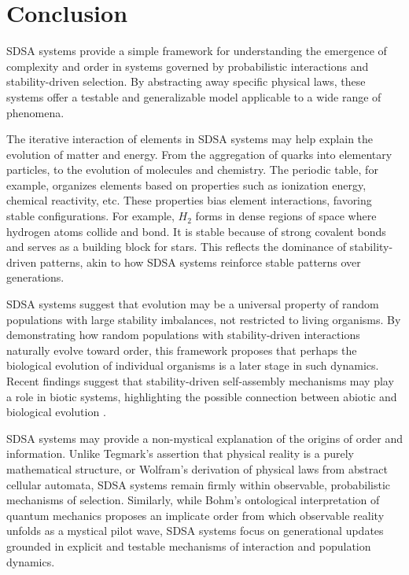 \documentclass[preprint,12pt]{elsarticle}
\begin{document}
\section{Conclusion}

SDSA systems provide a simple framework for understanding the emergence of complexity and order in systems governed by probabilistic interactions and stability-driven selection. By abstracting away specific physical laws, these systems offer a testable and generalizable model applicable to a wide range of phenomena. 

The iterative interaction of elements in SDSA systems may help explain the evolution of matter and energy. From the aggregation of quarks into elementary particles, to the evolution of molecules and chemistry. The periodic table, for example, organizes elements based on properties such as ionization energy, chemical reactivity, etc. These properties bias element interactions, favoring stable configurations. For example, \( H_2 \) forms in dense regions of space where hydrogen atoms collide and bond. It is stable because of strong covalent bonds and serves as a building block for stars. This reflects the dominance of stability-driven patterns, akin to how SDSA systems reinforce stable patterns over generations. 

SDSA systems suggest that evolution may be a universal property of random populations with large stability imbalances, not restricted to living organisms. By demonstrating how random populations with stability-driven interactions naturally evolve toward order, this framework proposes that perhaps the biological evolution of individual organisms is a later stage in such dynamics. Recent findings suggest that stability-driven self-assembly mechanisms may play a role in biotic systems, highlighting the possible connection between abiotic and biological evolution \cite{davies2022selfassembly}.

SDSA systems may provide a non-mystical explanation of the origins of order and information. Unlike Tegmark's \cite{tegmark2008mathematical} assertion that physical reality is a purely mathematical structure, or Wolfram's \cite{wolfram2020fundamental} derivation of physical laws from abstract cellular automata, SDSA systems remain firmly within observable, probabilistic mechanisms of selection. Similarly, while Bohm's ontological interpretation of quantum mechanics \cite{bohm1980wholeness} proposes an implicate order from which observable reality unfolds as a mystical pilot wave, SDSA systems focus on generational updates grounded in explicit and testable mechanisms of interaction and population dynamics.
\end{document}

